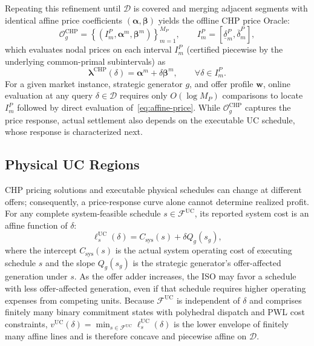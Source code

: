\documentclass[journal]{IEEEtran}
\newcommand{\blambda}{\bm\lambda}
\newcommand{\UC}{\mathrm{UC}}
\newcommand{\CHP}{\mathrm{CHP}}
\begin{document}
Repeating this refinement until $\mathcal{D}$ is covered and merging adjacent segments with identical affine price coefficients $(\bm{\alpha},\bm{\beta})$ yields the offline CHP price Oracle:
\begin{equation}
\mathcal{O}_g^{\CHP} = \left\{ \left(I_m^P,\bm{\alpha}^m,\bm{\beta}^m\right) \right\}_{m=1}^{M_P}, \qquad I_m^P = [\underline{\delta}_m^P,\overline{\delta}_m^P],\label{eq:price-oracle}
\end{equation}
which evaluates nodal prices on each interval $I_m^P$ (certified piecewise by the underlying common-primal subintervals) as
\begin{equation}
\blambda^{\CHP}(\delta) = \bm{\alpha}^m + \delta\bm{\beta}^m, \qquad \forall\delta\in I_m^P.\label{eq:affine-price}
\end{equation}
For a given market instance, strategic generator $g$, and offer profile $\bm{w}$, online evaluation at any query $\delta\in\mathcal{D}$ requires only $O(\log M_P)$ comparisons to locate $I_m^P$ followed by direct evaluation of~\eqref{eq:affine-price}. While $\mathcal{O}_g^{\CHP}$ captures the price response, actual settlement also depends on the executable UC schedule, whose response is characterized next.

\subsection{Physical UC Regions}

CHP pricing solutions and executable physical schedules can change at different offers; consequently, a price-response curve alone cannot determine realized profit. For any complete system-feasible schedule $s\in\mathcal{F}^{\UC}$, its reported system cost is an affine function of $\delta$:
\begin{equation}
\ell_s^{\UC}(\delta) = C_{\mathrm{sys}}(s) + \delta Q_g(s_g),\label{eq:uc-line}
\end{equation}
where the intercept $C_{\mathrm{sys}}(s)$ is the actual system operating cost of executing schedule $s$ and the slope $Q_g(s_g)$ is the strategic generator's offer-affected generation under $s$. As the offer adder increases, the ISO may favor a schedule with less offer-affected generation, even if that schedule requires higher operating expenses from competing units. Because $\mathcal{F}^{\UC}$ is independent of $\delta$ and comprises finitely many binary commitment states with polyhedral dispatch and PWL cost constraints, $v^{\UC}(\delta)=\min\nolimits_{s\in\mathcal{F}^{\UC}}\ell_s^{\UC}(\delta)$ is the lower envelope of finitely many affine lines and is therefore concave and piecewise affine on $\mathcal{D}$.
\end{document}
